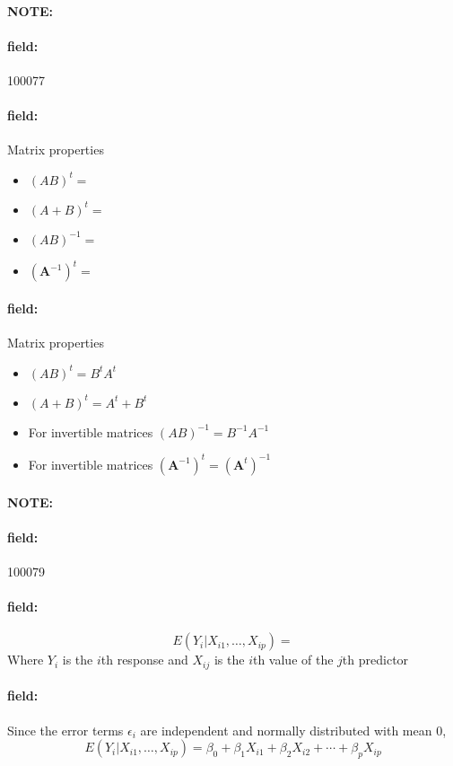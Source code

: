 \documentclass[12pt]{article}
\newenvironment{note}{\paragraph{NOTE:}}{}
\newenvironment{field}{\paragraph{field:}}{}
\begin{document}

\begin{note} \begin{field} \tiny 100077 \end{field}
 \begin{field}
  Matrix properties
  \begin{itemize}
   \item $(AB)^{t} = $
   \item $(A+B)^t = $
   \item $(AB)^{-1} = $
   \item $(\mathbf{A}^{-1})^t = $
  \end{itemize}
 \end{field}
 \begin{field}
  Matrix properties
  \begin{itemize}
   \item $(AB)^{t} = B^tA^t$
   \item $(A+B)^t = A^t + B^t$
   \item For invertible matrices $(AB)^{-1} = B^{-1}A^{-1}$
   \item For invertible matrices $(\mathbf{A}^{-1})^t = (\mathbf{A}^t)^{-1}$
  \end{itemize}
 \end{field}
\end{note}




\begin{note} \begin{field} \tiny 100079 \end{field}
 \begin{field}
  $$ E(Y_i | X_{i1}, \ldots , X_{ip}) = $$
  Where $Y_i$ is the $i$th response and $X_{ij}$ is the $i$th value of the $j$th predictor
 \end{field}
 \begin{field}
  Since the error terms $\epsilon_i$ are independent and normally distributed with mean 0,
  $$ E(Y_i | X_{i1}, \ldots , X_{ip}) = \beta_0 + \beta_1 X_{i1} + \beta_2 X_{i2} + \cdots + \beta_pX_{ip}$$
 \end{field}
\end{note}
\end{document}
